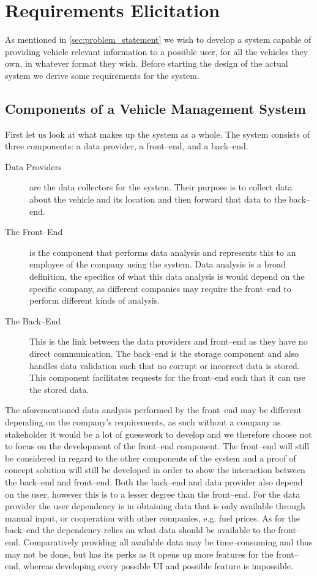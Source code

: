 \chapter{Requirements Elicitation}\label{cha:requirements_elicitation}
As mentioned in \cref{sec:problem_statement} we wish to develop a system capable of providing vehicle relevant information to a possible user, for all the vehicles they own, in whatever format they wish.
Before starting the design of the actual system we derive some requirements for the system.

\section{Components of a Vehicle Management System}\label{sec:constituents_of_the_system}
First let us look at what makes up the system as a whole.
The system consists of three components: a data provider, a front--end, and a back--end.
\begin{description}
    \item [Data Providers] are the data collectors for the system. Their purpose is to collect data about the vehicle and its location and then forward that data to the back--end.
    \item [The Front--End] is the component that performs data analysis and represents this to an employee of the company using the system.
    Data analysis is a broad definition, the specifics of what this data analysis is would depend on the specific company, as different companies may require the front--end to perform different kinds of analysis.
    \item [The Back--End] This is the link between the data providers and front--end as they have no direct communication.
    The back--end is the storage component and also handles data validation such that no corrupt or incorrect data is stored.
    This component facilitates requests for the front--end such that it can use the stored data.
\end{description}

The aforementioned data analysis performed by the front--end may be different depending on the company's requirements, as such without a company as stakeholder it would be a lot of guesswork to develop and we therefore choose not to focus on the development of the front--end component.
The front--end will still be considered in regard to the other components of the system and a proof of concept solution will still be developed in order to show the interaction between the back--end and front--end.
Both the back--end and data provider also depend on the user, however this is to a lesser degree than the front--end.
For the data provider the user dependency is in obtaining data that is only available through manual input, or cooperation with other companies, e.g. fuel prices.
As for the back--end the dependency relies on what data should be available to the front--end.
Comparatively providing all available data may be time--consuming and thus may not be done, but has its perks as it opens up more features for the front--end, whereas developing every possible UI and possible feature is impossible.

